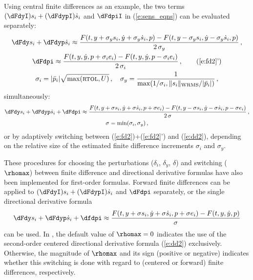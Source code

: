 Using central finite differences as an example, the two terms 
$(\dFdyI) s_i + (\dFdypI) \dot s_i$ and $\dFdpiI$ in (\ref{e:sens_eqns}) 
can be evaluated separately:
\begin{gather}
  \dFdy s_i + \dFdyp \dot s_i \approx
  \frac{F(t, y+\sigma_y s_i, \dot y + \sigma_y \dot s_i , p)- F(t, y-\sigma_y s_i, \dot y - \sigma_y \dot s_i , p)}{2\,\sigma_y} \, , \label{e:fd2} \\
  \dFdpi \approx 
  \frac{F(t, y, \dot y, p + \sigma_i e_i)- F(t, y, \dot y, p - \sigma_i e_i)}{2\,\sigma_i} \, , \tag{\ref{e:fd2}'} \\
  \sigma_i = |{\bar p}_i| \sqrt{\max( \mbox{\sc rtol} , U)} \, , \quad
  \sigma_y = \frac{1}{\max(1/\sigma_i, \|s_i\|_{\mbox{\scriptsize WRMS}}/|{\bar p}_i|)} \, , \nonumber
\end{gather}
simultaneously:
\begin{gather}
  \dFdy s_i + \dFdyp \dot s_i + \dFdpi \approx
  \frac{F(t, y+\sigma s_i, \dot y + \sigma \dot s_i , p + \sigma e_i) -
    F(t, y-\sigma s_i, \dot y - \sigma \dot s_i , p - \sigma e_i)}{2\,\sigma} \, , \label{e:dd2} \\
  \sigma = \min(\sigma_i, \sigma_y) \, , \nonumber
\end{gather}
or by adaptively switching between (\ref{e:fd2})+(\ref{e:fd2}') and (\ref{e:dd2}), 
depending on the relative size of the estimated finite difference 
increments $\sigma_i$ and $\sigma_y$.

These procedures for choosing the perturbations ($\delta_i$, $\delta_y$, $\delta$)
and switching ($\rhomax$) between finite difference and directional derivative 
formulas have also been implemented for first-order formulas.
Forward finite differences can be applied to $(\dFdyI) s_i + (\dFdypI) \dot s_i$ and
$\dFdpi$ separately, or the single directional derivative formula
\begin{equation*}
\dFdy s_i + \dFdyp \dot s_i + \dfdpi \approx
\frac{F(t, y+\sigma s_i, \dot y + \sigma \dot s_i , p + \sigma e_i) - F(t, y, \dot y, p)}{\sigma}
\end{equation*}
can be used. In {\idas}, the default value of $\rhomax=0$ indicates the use of
the second-order centered directional derivative formula (\ref{e:dd2}) exclusively.
Otherwise, the magnitude of $\rhomax$ and its sign (positive or
negative) indicates whether this switching is done with regard to
(centered or forward) finite differences, respectively.

